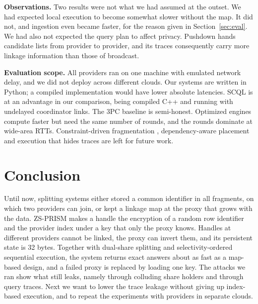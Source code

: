 \documentclass[conference]{IEEEtran}
\newcommand{\sys}{ZS-PRISM}
\begin{document}
\textbf{Observations.} Two results were not what we had assumed at the outset. We had expected local execution to become somewhat slower without the map. It did not, and ingestion even became faster, for the reason given in Section~\ref{sec:eval}. We had also not expected the query plan to affect privacy. Pushdown hands candidate lists from provider to provider, and its traces consequently carry more linkage information than those of broadcast.

\textbf{Evaluation scope.} All providers ran on one machine with emulated network delay, and we did not deploy across different clouds. Our systems are written in Python; a compiled implementation would have lower absolute latencies. SCQL is at an advantage in our comparison, being compiled C++ and running with undelayed coordinator links. The 3PC baseline is semi-honest. Optimized engines \cite{liagouris2023secrecy,poddar2021senate} compute faster but need the same number of rounds, and the rounds dominate at wide-area RTTs. Constraint-driven fragmentation \cite{ciriani2010combining}, dependency-aware placement \cite{decapitani2014dependencies} and execution that hides traces are left for future work.

\section{Conclusion}
Until now, splitting systems either stored a common identifier in all fragments, on which two providers can join, or kept a linkage map at the proxy that grows with the data. \sys{} makes a handle the encryption of a random row identifier and the provider index under a key that only the proxy knows. Handles at different providers cannot be linked, the proxy can invert them, and its persistent state is 32 bytes. Together with dual-share splitting and selectivity-ordered sequential execution, the system returns exact answers about as fast as a map-based design, and a failed proxy is replaced by loading one key. The attacks we ran show what still leaks, namely through colluding share holders and through query traces. Next we want to lower the trace leakage without giving up index-based execution, and to repeat the experiments with providers in separate clouds.



\end{document}
